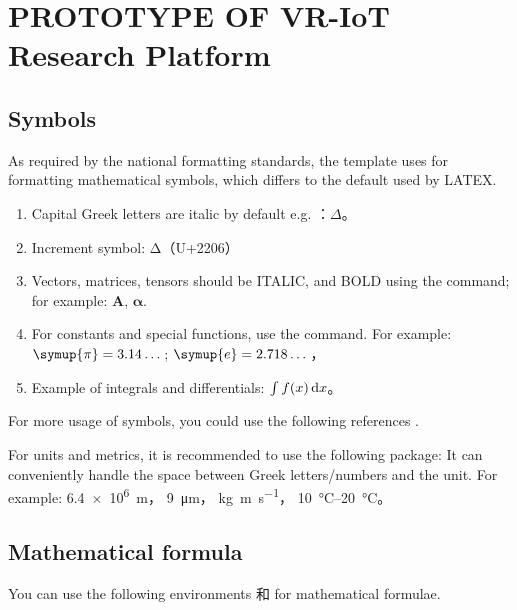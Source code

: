 
\chapter{PROTOTYPE OF VR-IoT Research Platform}

\section{Symbols}

As required by the national formatting standards, the template uses  for formatting mathematical symbols, which differs to the default used by LATEX. 

\begin{enumerate}
  \item Capital Greek letters are italic by default e.g. ：$\Delta$。
  \item Increment symbol: $\increment$（U+2206）
  \item Vectors, matrices, tensors should be ITALIC, and BOLD using the  command; for example: $\symbf{A}$, $\symbf{\alpha}$.
  \item For constants and special functions, use the  command. For example:
    $\symup{\pi} = 3.14\dots$; $\symup{e} = 2.718\dots$，
  \item Example of integrals and differentials: $\int f(x) \mathop{}\!\mathrm{d} x$。
\end{enumerate}

For more usage of symbols, you could use the following references
\href{http://mirrors.ctan.org/macros/latex/contrib/unicode-math/unicode-math.pdf}{}
\href{http://mirrors.ctan.org/macros/latex/contrib/unicode-math/unimath-symbols.pdf}{}.

For units and metrics, it is recommended to use the following package:
\href{http://mirrors.ctan.org/macros/latex/contrib/siunitx/siunitx.pdf}{}
It can conveniently handle the space between Greek letters/numbers and the unit. For example:
\SI{6.4e6}{m}，
\SI{9}{\micro\meter}，
\si{kg.m.s^{-1}}，
\SIrange{10}{20}{\degreeCelsius}。



\section{Mathematical formula}

You can use the following environments  和  for mathematical formulae.

